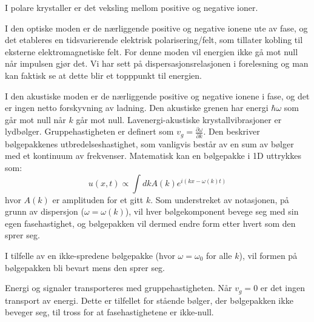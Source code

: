\documentclass{article}
\begin{document}
I polare krystaller er det veksling mellom positive og negative ioner. 

I den optiske moden er de nærliggende positive og negative ionene ute av fase, og det etableres en tidsvarierende elektrisk polarisering/felt, som tillater kobling til eksterne elektromagnetiske felt. For denne moden vil energien ikke gå mot null når impulsen gjør det. Vi har sett på dispersasjonsrelasjonen i forelesning og man kan faktisk se at dette blir et topppunkt til energien.

I den akustiske moden er de nærliggende positive og negative ionene i fase, og det er ingen netto forskyvning av ladning. Den akustiske grenen har energi $\hbar \omega$ som går mot null når $k$ går mot null. Lavenergi-akustiske krystallvibrasjoner er lydbølger.
Gruppehastigheten er definert som $v_g = \frac{\partial \omega}{\partial k}$. Den beskriver bølgepakkenes utbredelseshastighet, som vanligvis består av en sum av bølger med et kontinuum av frekvenser. Matematisk kan en bølgepakke i 1D uttrykkes som:
\begin{equation}
    u(x,t) \propto \int dk A(k) e^{i(kx -\omega(k) t)}
\end{equation}
hvor $A(k)$ er amplituden for et gitt $k$. Som understreket av notasjonen, på grunn av dispersjon ($\omega = \omega(k)$), vil hver bølgekomponent bevege seg med sin egen fasehastighet, og bølgepakken vil dermed endre form etter hvert som den sprer seg.

I tilfelle av en ikke-spredene bølgepakke (hvor $\omega = \omega_0$ for alle $k$), vil formen på bølgepakken bli bevart mens den sprer seg.

Energi og signaler transporteres med gruppehastigheten. Når $v_g = 0$ er det ingen transport av energi. Dette er tilfellet for stående bølger, der bølgepakken ikke beveger seg, til tross for at fasehastighetene er ikke-null.
\end{document}
